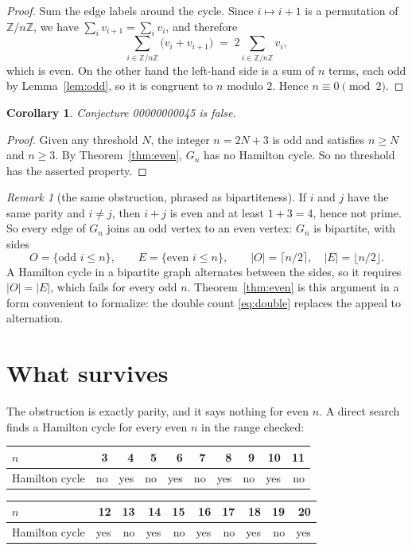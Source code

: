 \documentclass[11pt]{article}
\theoremstyle{plain}
\newtheorem{corollary}[theorem]{Corollary}
\theoremstyle{remark}
\newtheorem{remark}[theorem]{Remark}
\begin{document}
\begin{proof}
Sum the edge labels around the cycle. Since $i\mapsto i+1$ is a permutation of
$\mathbb Z/n\mathbb Z$, we have $\sum_i v_{i+1}=\sum_i v_i$, and therefore
\begin{equation}\label{eq:double}
  \sum_{i\in\mathbb Z/n\mathbb Z}\bigl(v_i+v_{i+1}\bigr)
  \;=\;2\sum_{i\in\mathbb Z/n\mathbb Z}v_i ,
\end{equation}
which is even. On the other hand the left-hand side is a sum of $n$ terms, each
odd by Lemma~\ref{lem:odd}, so it is congruent to $n$ modulo $2$. Hence
$n\equiv0\pmod 2$.
\end{proof}

\begin{corollary}
Conjecture 00000000045 is false.
\end{corollary}

\begin{proof}
Given any threshold $N$, the integer $n=2N+3$ is odd and satisfies $n\ge N$ and
$n\ge3$. By Theorem~\ref{thm:even}, $G_n$ has no Hamilton cycle. So no
threshold has the asserted property.
\end{proof}

\begin{remark}[the same obstruction, phrased as bipartiteness]
If $i$ and $j$ have the same parity and $i\ne j$, then $i+j$ is even and at
least $1+3=4$, hence not prime. So every edge of $G_n$ joins an odd vertex to
an even vertex: $G_n$ is bipartite, with sides
\[
  O=\{\text{odd }i\le n\},\qquad E=\{\text{even }i\le n\},
  \qquad |O|=\lceil n/2\rceil,\quad |E|=\lfloor n/2\rfloor .
\]
A Hamilton cycle in a bipartite graph alternates between the sides, so it
requires $|O|=|E|$, which fails for every odd $n$. Theorem~\ref{thm:even} is
this argument in a form convenient to formalize: the double count
\eqref{eq:double} replaces the appeal to alternation.
\end{remark}

\section{What survives}

The obstruction is exactly parity, and it says nothing for even $n$. A direct
search finds a Hamilton cycle for every even $n$ in the range checked:

\begin{center}
\begin{tabular}{lrrrrrrrrr}
\toprule
$n$ & 3 & 4 & 5 & 6 & 7 & 8 & 9 & 10 & 11\\
\midrule
Hamilton cycle & no & yes & no & yes & no & yes & no & yes & no\\
\bottomrule
\end{tabular}

\medskip

\begin{tabular}{lrrrrrrrrr}
\toprule
$n$ & 12 & 13 & 14 & 15 & 16 & 17 & 18 & 19 & 20\\
\midrule
Hamilton cycle & yes & no & yes & no & yes & no & yes & no & yes\\
\bottomrule
\end{tabular}
\end{center}
\end{document}
